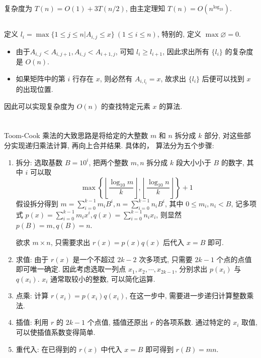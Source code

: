 \documentclass[8pt]{article}
\def\le{\leqslant}
\def\ge{\geqslant}
\begin{document}
复杂度为 $T(n) = O(1) + 3T(n/2)$, 由主定理知 $T(n) = O(n^{\log_23})$.

\subsection{}

定义 $l_i = \max\{1 \le j \le n | A_{i,j} \le x\} \ (1 \le i \le n)$, 特别的, 定义 $\max \varnothing = 0$.

\begin{itemize}
	\item 由于$A_{i, j} < A_{i,j+1}, A_{i,j} < A_{i+1, j}$, 可知 $l_i \ge l_{i + 1}$, 因此求出所有 $\{l_i\}$ 的复杂度是 $O(n)$.
	\item 如果矩阵中的第 $i$ 行存在 $x$, 则必然有 $A_{i, l_i} = x$, 故求出 $\{l_i\}$ 后便可以找到 $x$ 的出现位置.
\end{itemize}

因此可以实现复杂度为 $O(n)$ 的查找特定元素 $x$ 的算法.

\section{}

Toom-Cook 乘法的大致思路是将给定的大整数 $m$ 和 $n$ 拆分成 $k$ 部分, 对这些部分实现递归乘法计算, 再向上合并结果. 具体的， 算法分为五个步骤:

\begin{enumerate}
	\item 拆分: 选取基数 $B = 10^i$, 把两个整数 $m, n$ 拆分成 $k$ 段大小小于 $B$ 的数字, 其中 $i$ 可以取 $$\max\left\{\left\lfloor\frac{\log_{10}m}{k}\right\rfloor, \left\lfloor\frac{\log_{10}n}{k}\right\rfloor\right\} + 1$$
	假设拆分得到 $m = \sum\limits_{i=0}^{k-1}m_iB^i, n = \sum\limits_{i=0}^{k-1}n_iB^i$, 其中 $0 \le m_i, n_i < B$, 记多项式 $p(x) = \sum\limits_{i=0}^{k-1}m_ix^i, q(x) = \sum\limits_{i=0}^{k-1}n_ix_i$, 则显然 $p(B) = m, q(B) = n$.

	欲求 $m \times n$, 只需要求出 $r(x) = p(x)q(x)$ 后代入 $x = B$ 即可.

	\item 求值: 由于 $r(x)$ 是一个不超过 $2k-2$ 次多项式, 只需要 $2k-1$ 个点的点值即可唯一确定. 因此考虑选取一列点 $x_1, x_2, \cdots, x_{2k-1}$, 分别求出 $p(x_i)$ 与 $q(x_i)$. $x_i$ 通常取较小的整数, 可以简化运算.

	\item 点乘: 计算 $r(x_i) = p(x_i)q(x_i)$, 在这一步中, 需要进一步递归计算整数乘法.
	\item 插值: 利用 $r$ 的 $2k-1$ 个点值, 插值还原出 $r$ 的各项系数. 通过特定的 $x_i$ 取值, 可以使插值系数变得简单.
	\item 重代入: 在已得到的 $r(x)$ 中代入 $x = B$ 即可得到 $r(B) = mn$.
\end{enumerate}
\end{document}
